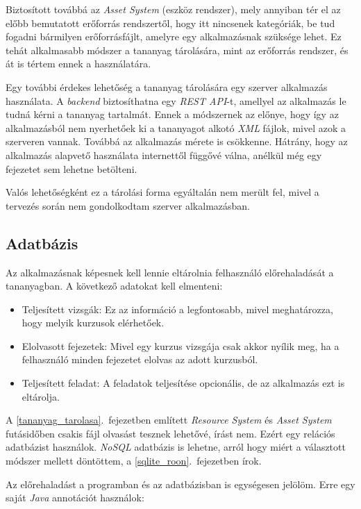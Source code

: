 \documentclass[12pt,a4paper]{article}
\newcommand{\xml}{\textit{XML}\xspace}
\begin{document}
	Biztosított továbbá az \textit{Asset System} (eszköz rendszer), mely annyiban tér el az előbb bemutatott erőforrás rendszertől, hogy itt nincsenek kategóriák, be tud fogadni bármilyen erőforrásfájlt, amelyre egy alkalmazásnak szüksége lehet. Ez tehát alkalmasabb módszer a tananyag tárolására, mint az erőforrás rendszer, és át is tértem ennek a használatára.
	
	Egy további érdekes lehetőség a tananyag tárolására egy szerver alkalmazás használata. A \textit{backend} biztosíthatna egy \textit{REST API}-t, amellyel az alkalmazás le tudná kérni a tananyag tartalmát. Ennek a módszernek az előnye, hogy így az alkalmazásból nem nyerhetőek ki a tananyagot alkotó \xml fájlok, mivel azok a szerveren vannak. Továbbá az alkalmazás mérete is csökkenne. Hátrány, hogy az alkalmazás alapvető használata internettől függővé válna, anélkül még egy fejezetet sem lehetne betölteni. 
	
	Valós lehetőségként ez a tárolási forma egyáltalán nem merült fel, mivel a tervezés során nem gondolkodtam szerver alkalmazásban.
	
	\subsection{Adatbázis}
	
	Az alkalmazásnak képesnek kell lennie eltárolnia felhasználó előrehaladását a tananyagban. A következő adatokat kell elmenteni:
	
	\begin{itemize}
		\item Teljesített vizsgák: Ez az információ a legfontosabb, mivel meghatározza, hogy melyik kurzusok elérhetőek.
		\item Elolvasott fejezetek: Mivel egy kurzus vizsgája csak akkor nyílik meg, ha a felhasználó minden fejezetet elolvas az adott kurzusból.
		\item Teljesített feladat: A feladatok teljesítése opcionális, de az alkalmazás ezt is eltárolja.
	\end{itemize}
	
	A \ref{tananyag_tarolasa}.\ fejezetben említett \textit{Resource System} és \textit{Asset System} futásidőben csakis fájl olvasást tesznek lehetővé, írást nem. Ezért egy relációs adatbázist használok. \textit{NoSQL} adatbázis is lehetne, arról hogy miért a választott módszer mellett döntöttem, a \ref{sqlite_roon}.\ fejezetben írok.
	
	Az előrehaladást a programban és az adatbázisban is egységesen jelölöm. Erre egy saját \textit{Java} annotációt használok:
	
\end{document}
